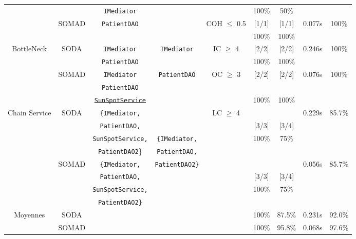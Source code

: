 \begin{table*}
\begin{tabular}{|c|c|c|c|c|c|c|c|c|}
 &  & \texttt{IMediator}  &  &  & 100\%  & 50\%  &  & \tabularnewline
 \cline{2-2} \cline{6-9}
 & \multirow{2}{*}{SOMAD}  & \multirow{2}{*}{\texttt{PatientDAO}}  &  & \multirow{2}{*}{COH $\leqslant$ 0.5}  & {[}1/1{]}  & {[}1/1{]}  & \multirow{2}{*}{0.077s}  & \multirow{2}{*}{100\%}\tabularnewline
 &  &  &  &  & 100\%  & 100\%  &  & \tabularnewline
 \cline{2-3} \cline{6-9} 
\hline 
\hline 
\multirow{5}{*}{BottleNeck}  & \multirow{2}{*}{SODA}  & \texttt{IMediator}  & \multirow{2}{*}{\texttt{IMediator}}  & \multirow{2}{*}{IC $\geqslant$ 4 }  & {[}2/2{]}  & {[}2/2{]}  & \multirow{2}{*}{0.246s}  & \multirow{2}{*}{100\%}\tabularnewline
 &  & \texttt{PatientDAO}  &  &  & 100\%  & 100\%  &  & \tabularnewline
 \cline{2-3} \cline{6-9} 
 & \multirow{3}{*}{SOMAD}  & \texttt{IMediator}  & \multirow{3}{*}{\texttt{PatientDAO}}  & \multirow{3}{*}{OC $\geqslant$ 3 }  & \multirow{2}{*}{{[}2/2{]} }  & \multirow{2}{*}{{[}2/2{]} }  & \multirow{3}{*}{0.076s }  & \multirow{3}{*}{100\% }\tabularnewline
 &  & \texttt{PatientDAO}  &  &  &  &  &  & \tabularnewline
 &  & \texttt{\sout{SunSpotService}}  &  &  & 100\%  & 100\%  &  & \tabularnewline
\hline 
\hline 
\multirow{8}{*}{Chain Service}  & \multirow{4}{*}{SODA}  & \texttt{\{IMediator,}  & \multirow{2}{*}{}  & \multirow{8}{*}{LC $\geqslant$ 4 }  &  &  & \multirow{4}{*}{0.229s}  & \multirow{4}{*}{85.7\%}\tabularnewline
 &  & \texttt{PatientDAO,}  &  &  & {[}3/3{]}  & {[}3/4{]}  &  & \tabularnewline
 &  & \texttt{SunSpotService,}  & \texttt{\{IMediator,}  &  & 100\%  & 75\%  &  & \tabularnewline
 &  & \texttt{PatientDAO2}\}  & \texttt{PatientDAO,}  &  &  &  &  & \tabularnewline
 \cline{2-3} \cline{6-9} 

 & \multirow{4}{*}{SOMAD}  & \texttt{\{IMediator,}  & \texttt{PatientDAO2\}}  &  &  &  & \multirow{4}{*}{0.056s }  & \multirow{4}{*}{85.7\%}\tabularnewline
 &  & \texttt{PatientDAO,}  & \multirow{3}{*}{}  &  & {[}3/3{]}  & {[}3/4{]}  &  & \tabularnewline
 &  & \texttt{SunSpotService,}  &  &  & 100\%  & 75\%  &  & \tabularnewline
 &  & \texttt{PatientDAO2\}}  &  &  &  &  &  & \tabularnewline
\hline 
\hline 
\multirow{2}{*}{Moyennes}  & SODA  & \multicolumn{1}{c}{} & \multicolumn{2}{c|}{} & 100\%  & 87.5\%  & 0.231s  & 92.0\%\tabularnewline
\cline{2-2} \cline{6-9} 
 & SOMAD  & \multicolumn{1}{c}{} & \multicolumn{2}{c|}{} & 100\%  & 95.8\%  & 0.068s  & 97.6\%\tabularnewline
\hline 
\end{tabular}\vspace{-0.3cm}
\end{table*}


